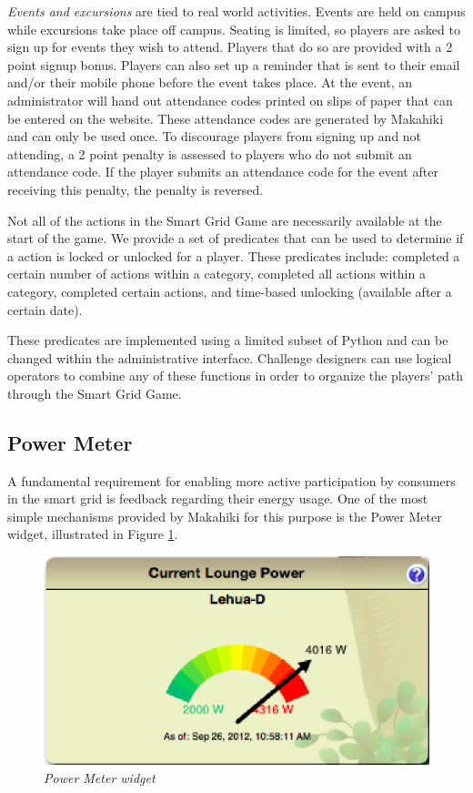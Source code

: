 {\em Events and excursions} are tied to real world activities. Events are held on campus while excursions take place off campus. Seating is limited, so players are asked to sign up for events they wish to attend. Players that do so are provided with a 2 point signup bonus. Players can also set up a reminder that is sent to their email and/or their mobile phone before the event takes place. At the event, an administrator will hand out attendance codes printed on slips of paper that can be entered on the website. These attendance codes are generated by Makahiki and can only be used once. To discourage players from signing up and not attending, a 2 point penalty is assessed to players who do not submit an attendance code. If the player submits an attendance code for the event after receiving this penalty, the penalty is reversed.

Not all of the actions in the Smart Grid Game are necessarily available at
the start of the game. We provide a set of predicates that can be used to determine if a action is locked or unlocked for a player. These predicates include: completed a certain number of actions within a category, completed all actions within a category, completed certain actions, and time-based unlocking (available after a certain date).

These predicates are implemented using a limited subset of Python and can
be changed within the administrative interface. Challenge designers can use
logical operators to combine any of these functions in order to organize
the players' path through the Smart Grid Game.

\subsection{Power Meter}

A fundamental requirement for enabling more active participation by consumers in the smart grid is feedback regarding their energy usage.  One of the most simple mechanisms provided by Makahiki for this purpose is the Power Meter widget, illustrated in Figure \ref{fig:PowerMeter}.

\begin{figure}[th]
  \center
  \includegraphics[width=0.95\columnwidth]{power-meter.eps}
  \caption{\em \small Power Meter widget}
  \label{fig:PowerMeter}
\end{figure}

